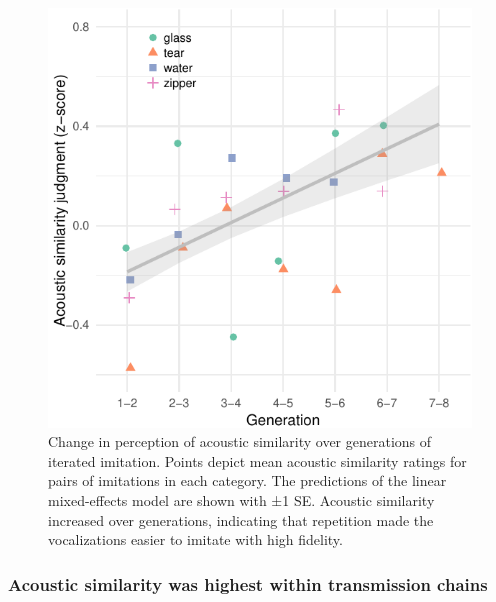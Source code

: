 \documentclass[english,floatsintext,man]{apa6}
\theoremstyle{definition}
\theoremstyle{definition}
\theoremstyle{remark}
\begin{document}
\begin{figure}
\centering
\includegraphics{fig2-1.pdf}
\caption{\label{fig:fig2}Change in perception of acoustic similarity over
generations of iterated imitation. Points depict mean acoustic
similarity ratings for pairs of imitations in each category. The
predictions of the linear mixed-effects model are shown with ±1 SE.
Acoustic similarity increased over generations, indicating that
repetition made the vocalizations easier to imitate with high fidelity.}
\end{figure}

\subsubsection{Acoustic similarity was highest within transmission
chains}\label{acoustic-similarity-was-highest-within-transmission-chains}
\end{document}
